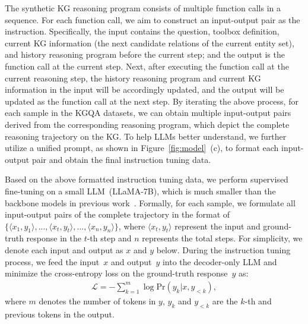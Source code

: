The synthetic KG reasoning program consists of multiple function calls in a sequence. For each function call, we aim to construct an input-output pair as the instruction. Specifically, the input contains the question, toolbox definition, current KG information (\ie the next candidate relations of the current entity set), and history reasoning program before the current step; and the output is the function call at the current step.
Next, after executing the function call at the current reasoning step, the history reasoning program and current KG information in the input will be accordingly updated, and the output will be updated as the function call at the next step.
By iterating the above process, for each sample in the KGQA datasets, we can obtain multiple input-output pairs derived from the corresponding reasoning program, which depict the complete reasoning trajectory on the KG.
To help LLMs better understand, we further utilize a unified prompt, as shown in Figure~\ref{fig:model}~(c), to format each input-output pair and obtain the final instruction tuning data.

Based on the above formatted instruction tuning data, we perform supervised fine-tuning on a small LLM~(\ie LLaMA-7B), which is much smaller than the backbone models in previous work~\cite{Jiang-2023-arxiv-StructGPT}.
Formally, for each sample, we formulate all input-output pairs of the complete trajectory in the format of $\{\langle x_1, y_1 \rangle , ..., \langle x_t, y_t \rangle, ..., \langle x_{n}, y_{n} \rangle \}$, where $\langle x_t, y_t \rangle$ represent the input and ground-truth response in the $t$-th step and $n$ represents the total steps.
For simplicity, we denote each input and output as $x$ and $y$ below.
During the instruction tuning process, we feed the input~$x$ and output~$y$ into the decoder-only LLM and minimize the cross-entropy loss on the ground-truth response~$y$ as:
\begin{align}
    \mathcal{L} = - \sum_{k=1}^m \log \text{Pr}(y_k|x, y_{<k}),
\end{align}
where $m$ denotes the number of tokens in $y$, $y_k$ and $y_{<k}$ are the $k$-th and previous tokens in the output.

